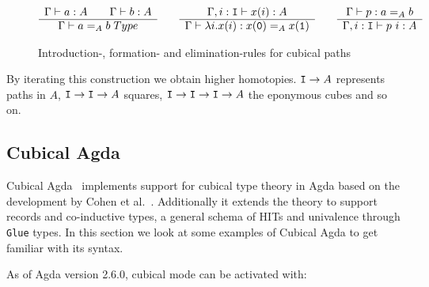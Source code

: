 \begin{figure}
\begin{equation*}
  \begin{array}[t]{c}
    \Gamma \vdash a : A \qquad \Gamma \vdash b : A\\
    \hline
    \Gamma \vdash a =_A b \; Type\\
  \end{array}
  \qquad
  \begin{array}[t]{c}
    \Gamma, i : \texttt{I} \vdash x(i) : A\\
    \hline
    \Gamma \vdash \lambda i.x(i) : x(\texttt{0}) =_A x(\texttt{1})\\
  \end{array}
  \qquad
  \begin{array}[t]{c}
    \Gamma \vdash p : a =_A b\\
    \hline
    \Gamma, i : \texttt{I} \vdash p~i : A
  \end{array}
\end{equation*}
  \caption{Introduction-, formation- and elimination-rules for cubical paths}
  \label{eq:path-rules}
\end{figure}

By iterating this construction we obtain higher homotopies. $\texttt{I} \rightarrow A$
represents paths in $A$, $\texttt{I} \rightarrow \texttt{I} \rightarrow A$ squares, $\texttt{I} \rightarrow \texttt{I} \rightarrow \texttt{I} \rightarrow A$ the
eponymous cubes and so on.

\subsection{Cubical Agda}
Cubical Agda~\cite{vezzosi2021cubical} implements support for cubical type
theory in Agda based on the development by Cohen et al.~\cite{cohen2016cubical}.
Additionally it extends the theory to support records and co-inductive types, a
general schema of HITs and univalence through \texttt{Glue} types. In this
section we look at some examples of Cubical Agda to get familiar with its
syntax.

As of Agda version 2.6.0, cubical mode can be activated with:
\begin{code}%
\>[0]\AgdaSymbol{\{-\#}\AgdaSpace{}%
\AgdaSpace{}%
\AgdaSpace{}%
\AgdaSymbol{\#-\}}\<%
\end{code}

